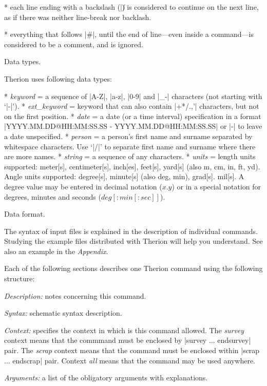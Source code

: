 * each line ending with a backslash (|\|) is considered to continue on 
  the next line, as if there was neither line-break nor backlash.

* everything that follows |#|, until the end of line---even inside a command---is 
  considered to be a comment, and is ignored.
\endlist


\subchapter Data types.

Therion uses following data types:

\list
* {\it keyword} = a sequence of |A-Z|, |a-z|, |0-9| and |_-| characters 
             (not starting with `|-|').
* {\it ext\_keyword} = keyword that can also contain |+*/.,'| characters, 
            but not on the first position.
* {\it date} = a date (or a time interval) specification in a format\hfil\break
          |YYYY.MM.DD@HH:MM:SS.SS - YYYY.MM.DD@HH:MM:SS.SS| or |-|
          to leave a date unspecified.
* {\it person} = a person's first name and surname separated by whitespace characters.
            Use `|/|' to separate first name and surname where there are 
            more names.
* {\it string} = a sequence of any characters.
* {\it units} = length units supported: 
           meter[s], centimeter[s], inch[es], feet[s], yard[s]
           (also m, cm, in, ft, yd).
           Angle units supported: degree[s], minute[s] (also deg, min), 
	   grad[s]. mil[s]. A degree value may be entered in decimal notation
	   ($x.y$) or in a special notation for degrees, minutes and seconds
	   ($deg[{:}min[{:}sec]]$).
\endlist


\subchapter Data format.

The syntax of input files is explained in the description of
individual commands. Studying the example files distributed with
Therion will help you understand. See also an example in the {\it Appendix}.

Each of the following sections describes
one Therion command using the following structure:

{\it Description:} notes concerning this command.

{\it Syntax:} schematic syntax description. 

{\it Context:} specifies the context in which is this command allowed. 
The {\it survey} context means that the commmand must be enclosed by 
|survey ... endsurvey| pair. The {\it scrap} context means that the command must be 
enclosed within |scrap ... endscrap| pair. Context {\it all} means that 
the command may be used anywhere.

{\it Arguments:} a list of the obligatory arguments with explanations.

